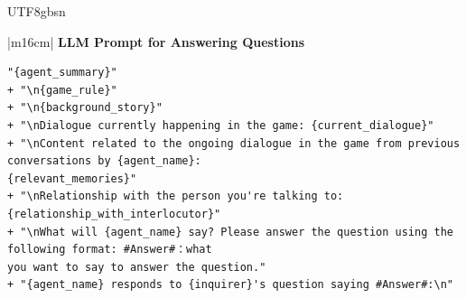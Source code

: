 \documentclass[11pt]{article}
\begin{document}
{%
\begin{CJK}{UTF8}{gbsn}
\begin{table}[ht!]
\centering
\begin{tabular}{|m{16cm}|}
\hline
{}  {\textbf{LLM Prompt for Answering Questions}} \\
\hline
\begin{minipage}[t]{\linewidth}
\small\begin{Verbatim}[fontsize=\small]
"{agent_summary}"
+ "\n{game_rule}"
+ "\n{background_story}"
+ "\nDialogue currently happening in the game: {current_dialogue}"
+ "\nContent related to the ongoing dialogue in the game from previous conversations by {agent_name}: 
{relevant_memories}"
+ "\nRelationship with the person you're talking to: {relationship_with_interlocutor}"
+ "\nWhat will {agent_name} say? Please answer the question using the following format: #Answer#：what 
you want to say to answer the question."
+ "{agent_name} responds to {inquirer}'s question saying #Answer#:\n"

\end{Verbatim}
\end{minipage} \\
\hline


\end{tabular}
\end{table}
\end{CJK}}
\end{document}
